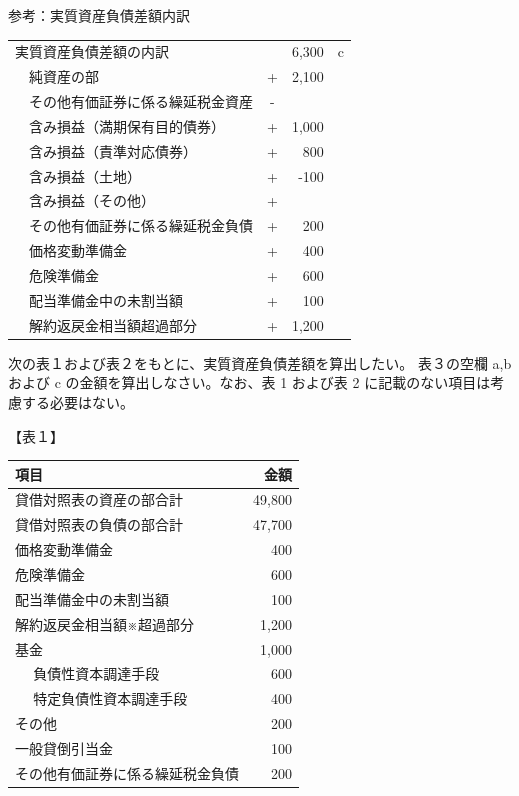 \documentclass[report,gutter=10mm,fore-edge=10mm,uplatex,dvipdfmx]{jlreq}
\begin{document}
参考：実質資産負債差額内訳\\
\begin{tabular}{|l|lc|r|c}
 \cline{1-4}
\multicolumn{2}{|l}{実質資産負債差額の内訳} & & 6,300&c\\ \cline{2-4}
&純資産の部& + & 2,100&\\ \cline{2-4}
&その他有価証券に係る繰延税金資産&-&&\\ \cline{2-4}
&含み損益（満期保有目的債券）&+&1,000&\\ \cline{2-4}
&含み損益（責準対応債券）&+&800&\\ \cline{2-4}
&含み損益（土地）&+&-100&\\ \cline{2-4}
&含み損益（その他）&+&&\\ \cline{2-4}
&その他有価証券に係る繰延税金負債&+&200&\\ \cline{2-4}
&価格変動準備金&+&400&\\ \cline{2-4}
&危険準備金&+&600&\\ \cline{2-4}
&配当準備金中の未割当額&+&100&\\ \cline{2-4}
&解約返戻金相当額超過部分&+&1,200&\\ \cline{1-4}
\end{tabular}


次の表１および表２をもとに、実質資産負債差額を算出したい。
表３の空欄 a,b および c の金額を算出しなさい。なお、表 1 および表 2 に記載のない項目は考慮する必要はない。

【表１】\\
\begin{tabular}{|l|l|r|}
 \hline
 \multicolumn{2}{|l|}{項目}&金額 \\ \hline
 \hline
 \multicolumn{2}{|l|}{貸借対照表の資産の部合計}&49,800 \\ \hline
 \multicolumn{2}{|l|}{貸借対照表の負債の部合計}&47,700 \\ \hline
 \multicolumn{2}{|l|}{価格変動準備金}&400 \\ \hline
 \multicolumn{2}{|l|}{危険準備金}&600 \\ \hline
 \multicolumn{2}{|l|}{配当準備金中の未割当額}&100 \\ \hline
 \multicolumn{2}{|l|}{解約返戻金相当額※超過部分}&1,200 \\ \hline
 \multicolumn{2}{|l|}{基金}&1,000 \\ \hline
 &負債性資本調達手段& 600\\ \hline
 &特定負債性資本調達手段& 400\\ \hline
 \multicolumn{2}{|l|}{その他}&200 \\ \hline
 \multicolumn{2}{|l|}{一般貸倒引当金}&100 \\ \hline
 \multicolumn{2}{|l|}{その他有価証券に係る繰延税金負債}&200 \\ \hline
\end{tabular}\\
\end{document}
